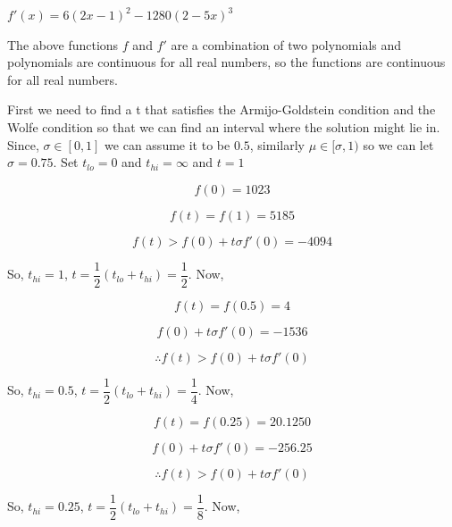 \documentclass[a4paper]{article}
\begin{document}
$f'(x) = 6(2x - 1)^2  - 1280(2 - 5x)^3$ 

The above functions $f$ and  $f'$ are a combination of two polynomials and polynomials are continuous for all real numbers, so the functions are continuous for all real numbers.

First we need to find a t that satisfies the Armijo-Goldstein condition and the Wolfe condition so that we can find an interval where the solution might lie in. Since, $\sigma \in [0, 1]$ we can assume it to be $0.5$, similarly $\mu \in [\sigma, 1)$ so we can let $\sigma = 0.75$.  Set $t_{lo} = 0$ and $t_{hi} = \infty$ and $t = 1$

\begin{equation}
f(0) = 1023
\end{equation}

\begin{equation}
f(t) = f(1) =  5185
\end{equation}

\begin{equation}
f(t) > f(0) + t{\sigma}f'(0) = -4094
\end{equation}

So, $t_{hi} = 1$, $t = \dfrac{1}{2}(t_{lo} + t_{hi}) = \dfrac{1}{2}$. Now, 

\begin{equation}
f(t) = f(0.5) = 4
\end{equation}

\begin{equation}
f(0) + t{\sigma}f'(0) = −1536
\end{equation}

\begin{equation}
\therefore f(t) > f(0) + t{\sigma}f'(0)
\end{equation}

So, $t_{hi} = 0.5$, $t = \dfrac{1}{2}(t_{lo} + t_{hi}) = \dfrac{1}{4}$. Now, 

\begin{equation}
f(t) = f(0.25) = 20.1250
\end{equation}

\begin{equation}
f(0) + t{\sigma}f'(0) = −256.25
\end{equation}

\begin{equation}
\therefore f(t) > f(0) + t{\sigma}f'(0)
\end{equation}

So, $t_{hi} = 0.25$, $t = \dfrac{1}{2}(t_{lo} + t_{hi}) = \dfrac{1}{8}$. Now, 
\end{document}
